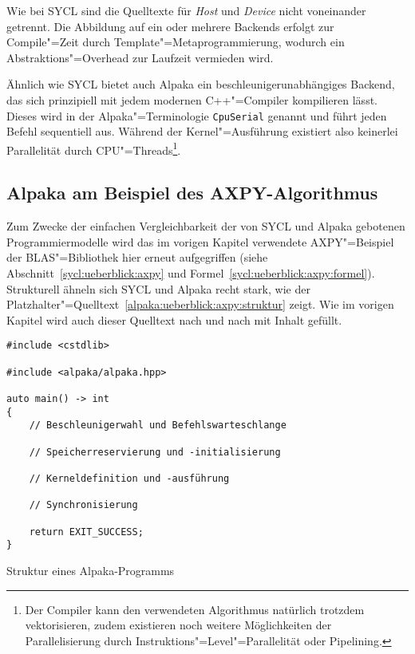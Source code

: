 Wie bei SYCL sind die Quelltexte für \textit{Host} und \textit{Device} nicht
voneinander getrennt. Die Abbildung auf ein oder mehrere Backends erfolgt zur
Compile"=Zeit durch Template"=Metaprogrammierung, wodurch ein
Abstraktions"=Overhead zur Laufzeit vermieden wird.

Ähnlich wie SYCL bietet auch Alpaka ein beschleunigerunabhängiges Backend, das
sich prinzipiell mit jedem modernen C++"=Compiler kompilieren lässt. Dieses
wird in der Alpaka"=Terminologie \texttt{CpuSerial} genannt und führt jeden
Befehl sequentiell aus. Während der Kernel"=Ausführung existiert also keinerlei
Parallelität durch CPU"=Threads\footnote{Der Compiler kann den verwendeten
Algorithmus natürlich trotzdem vektorisieren, zudem existieren noch weitere
Möglichkeiten der Parallelisierung durch Instruktions"=Level"=Parallelität oder
Pipelining.}.

\subsection{Alpaka am Beispiel des AXPY-Algorithmus}
\label{alpaka:ueberblick:axpy}

Zum Zwecke der einfachen Vergleichbarkeit der von SYCL und Alpaka gebotenen
Programmiermodelle wird das im vorigen Kapitel verwendete AXPY"=Beispiel der
BLAS"=Bibliothek hier erneut aufgegriffen (siehe
Abschnitt~\ref{sycl:ueberblick:axpy} und
Formel~\ref{sycl:ueberblick:axpy:formel}). Strukturell ähneln sich SYCL und
Alpaka recht stark, wie der
Platzhalter"=Quelltext~\ref{alpaka:ueberblick:axpy:struktur} zeigt. Wie im
vorigen Kapitel wird auch dieser Quelltext nach und nach mit Inhalt gefüllt.

\begin{code}
    \begin{verbatim}
#include <cstdlib>

#include <alpaka/alpaka.hpp>

auto main() -> int
{
    // Beschleunigerwahl und Befehlswarteschlange

    // Speicherreservierung und -initialisierung

    // Kerneldefinition und -ausführung

    // Synchronisierung

    return EXIT_SUCCESS;
}
    \end{verbatim}
    \caption{Struktur eines Alpaka-Programms}
    \label{alpaka:ueberblick:axpy:struktur}
\end{code}

